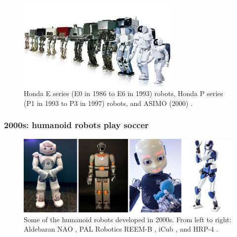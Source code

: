 \begin{figure}
    \centering
    \includegraphics[width=0.7\textwidth]{figures/01-introduction/The-ASIMO-humanoid-robot-history.png}
    \caption{Honda E series (E0 in 1986 to E6 in 1993) robots, Honda P series (P1 in
        1993 to P3 in 1997) robots, and ASIMO (2000)
        \cite{Shigemi2019ASIMOandHumanoidRobotResearchatHonda}.}
    \label{fig:introduction:ASIMO-humanoid-history}
\end{figure}

\subsubsection{2000s: humanoid robots play soccer}
\begin{figure}
    \centering
    \includegraphics[width=\textwidth]{figures/01-introduction/robots-in-2000.jpg}
    \caption{Some of the humanoid robots developed in 2000s. From left to right:
        Aldebaran NAO \cite{Gouaillier2008NAOHumanoid},
        PAL Robotics REEM-B \cite{Tellez2008REEMB},
        iCub \cite{Metta2010iCubHumanoid}, and
        HRP-4 \cite{Kaneko2011HRP4}.
    }
    \label{fig:introduction:robots-in-2000}
\end{figure}

